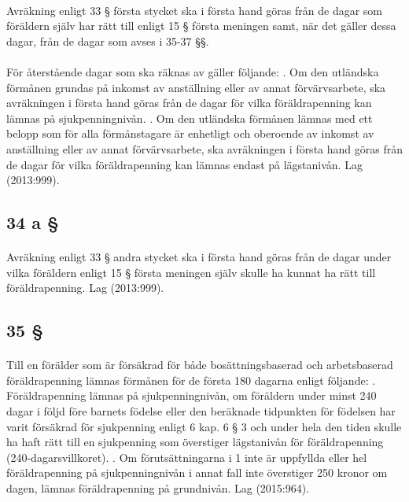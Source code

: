 \documentclass[a4paper,notitlepage,openany,10pt]{book}
\begin{document}
\paragraph*{}
Avräkning enligt 33 § första stycket ska i första hand göras från de dagar som föräldern själv har rätt till enligt 15 § första meningen samt, när det gäller dessa dagar, från de dagar som avses i 35-37 §§.
\paragraph*{}
För återstående dagar som ska räknas av gäller följande:
. Om den utländska förmånen grundas på inkomst av anställning eller av annat förvärvsarbete, ska avräkningen i första hand göras från de dagar för vilka föräldrapenning kan lämnas på sjukpenningnivån.
. Om den utländska förmånen lämnas med ett belopp som för alla förmånstagare är enhetligt och oberoende av inkomst av anställning eller av annat förvärvsarbete, ska avräkningen i första hand göras från de dagar för vilka föräldrapenning kan lämnas endast på lägstanivån.
Lag (2013:999).
\subsection*{34 a §}
\paragraph*{}
Avräkning enligt 33 § andra stycket ska i första hand göras från de dagar under vilka föräldern enligt 15 § första meningen själv skulle ha kunnat ha rätt till föräldrapenning.
Lag (2013:999).
\subsection*{35 §}
\paragraph*{}
Till en förälder som är försäkrad för både bosättningsbaserad och arbetsbaserad föräldrapenning lämnas förmånen för de första 180 dagarna enligt följande:
. Föräldrapenning lämnas på sjukpenningnivån, om föräldern under minst 240 dagar i följd före barnets födelse eller den beräknade tidpunkten för födelsen har varit försäkrad för sjukpenning enligt 6 kap. 6 § 3 och under hela den tiden skulle ha haft rätt till en sjukpenning som överstiger lägstanivån för föräldrapenning (240-dagarsvillkoret).
. Om förutsättningarna i 1 inte är uppfyllda eller hel föräldrapenning på sjukpenningnivån i annat fall inte överstiger 250 kronor om dagen, lämnas föräldrapenning på grundnivån.
Lag (2015:964).
\end{document}

